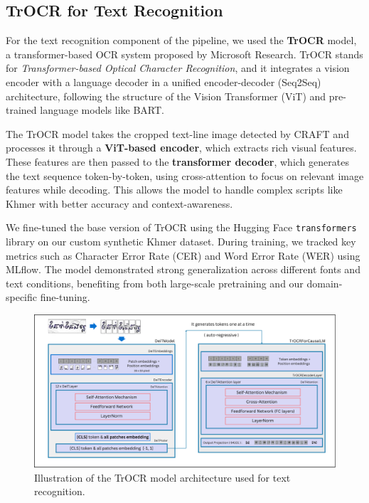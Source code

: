 \subsection{TrOCR for Text Recognition}
\label{subsec:trocr}

For the text recognition component of the pipeline, we used the \textbf{TrOCR} model, 
a transformer-based OCR system proposed by Microsoft Research. TrOCR stands for 
\textit{Transformer-based Optical Character Recognition}, and it integrates a vision 
encoder with a language decoder in a unified encoder-decoder (Seq2Seq) architecture, 
following the structure of the Vision Transformer (ViT) and pre-trained language models 
like BART.

The TrOCR model takes the cropped text-line image detected by CRAFT and processes it through a \textbf{ViT-based encoder}, which extracts rich visual features. These features are then passed to the \textbf{transformer decoder}, which generates the text sequence token-by-token, using cross-attention to focus on relevant image features while decoding. This allows the model to handle complex scripts like Khmer with better accuracy and context-awareness.

We fine-tuned the base version of TrOCR using the Hugging Face \texttt{transformers} library on our custom synthetic Khmer dataset. During training, we tracked key metrics such as Character Error Rate (CER) and Word Error Rate (WER) using MLflow. The model demonstrated strong generalization across different fonts and text conditions, benefiting from both large-scale pretraining and our domain-specific fine-tuning.

\begin{figure}[ht]
    \centering
    \includegraphics[width=\textwidth]{figures/trocr_model.png}
    \caption{Illustration of the TrOCR model architecture used for text recognition.}
    \label{fig:trocr-model}
\end{figure}


